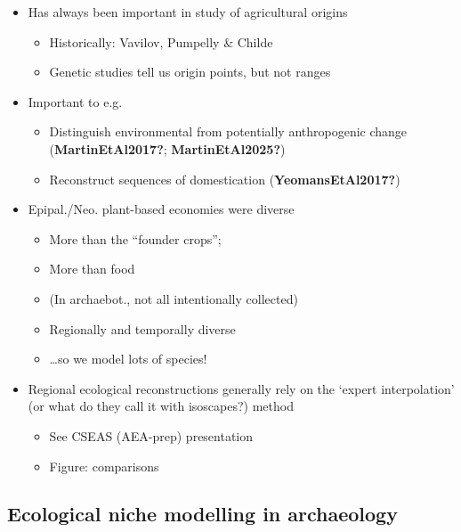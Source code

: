 \documentclass[
  number,
  review]{elsarticle}
\providecommand{\tightlist}{%
  \setlength{\itemsep}{0pt}\setlength{\parskip}{0pt}}\usepackage{longtable,booktabs,array}
\begin{document}
\begin{itemize}
\tightlist
\item
  Has always been important in study of agricultural origins

  \begin{itemize}
  \tightlist
  \item
    Historically: Vavilov, Pumpelly \& Childe
  \item
    Genetic studies tell us origin points, but not ranges
  \end{itemize}
\item
  Important to e.g.

  \begin{itemize}
  \tightlist
  \item
    Distinguish environmental from potentially anthropogenic change
    (\textbf{MartinEtAl2017?}; \textbf{MartinEtAl2025?})
  \item
    Reconstruct sequences of domestication (\textbf{YeomansEtAl2017?})
  \end{itemize}
\item
  Epipal./Neo. plant-based economies were diverse

  \begin{itemize}
  \tightlist
  \item
    More than the ``founder crops'';
  \item
    More than food
  \item
    (In archaebot., not all intentionally collected)
  \item
    Regionally and temporally diverse
  \item
    \ldots so we model lots of species!
  \end{itemize}
\item
  Regional ecological reconstructions generally rely on the `expert
  interpolation' (or what do they call it with isoscapes?) method

  \begin{itemize}
  \tightlist
  \item
    See CSEAS (AEA-prep) presentation
  \item
    Figure: comparisons
  \end{itemize}
\end{itemize}

\subsection{Ecological niche modelling in
archaeology}\label{ecological-niche-modelling-in-archaeology}
\end{document}
